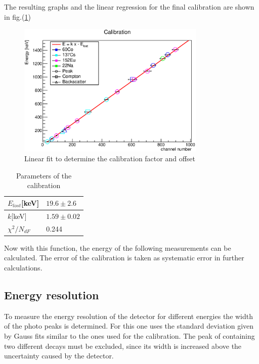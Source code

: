 \documentclass{article}
\begin{document}
The resulting graphs and the linear regression for the final calibration are shown in fig.(\ref{cali})
\begin{figure}[H]
    \centering
    \includegraphics[width=0.8\textwidth]{Graphen/calibrate/calibration_lin_reg.eps}
    \caption{Linear fit to determine the calibration factor and offset}
    \label{cali}
\end{figure}

\begin{table}[H]
    \centering
    \caption{Parameters of the calibration}
    \begin{tabular}{l|l}
    
        $E_{lost}$[keV] & $19.6 \pm 2.6$ \\\hline
        $k$[keV] & $1.59 \pm 0.02$ \\\hline
        $\chi^2/N_{dF}$ & 0.244\\
    
    \end{tabular}
\end{table}
Now with this function, the energy of the following measurements can be calculated. The error of the calibration is taken as systematic error in further calculations. 

\subsection{Energy resolution}
To measure the energy resolution of the detector for different energies the width of the photo peaks is determined.
For this one uses the standard deviation given by Gauss fits similar to the ones used for the calibration.
The peak of  containing two different decays must be excluded, since its width is increased above the uncertainty caused by the detector.
\end{document}
